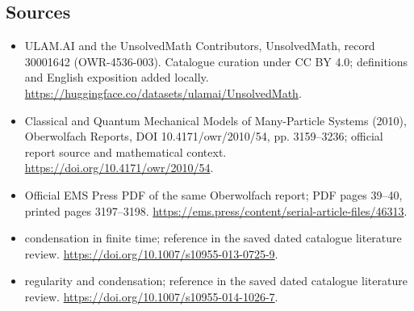 \documentclass[11pt]{article}
\begin{document}
\subsection{Sources}
\begin{itemize}
\item[\hypertarget{source:30001642:1}{S1}] ULAM.AI and the UnsolvedMath Contributors, UnsolvedMath, record 30001642 (OWR-4536-003). Catalogue curation under CC BY 4.0; definitions and English exposition added locally.
\url{https://huggingface.co/datasets/ulamai/UnsolvedMath}.
\item[\hypertarget{source:30001642:2}{S2}] Classical and Quantum Mechanical Models of Many-Particle Systems (2010), Oberwolfach Reports, DOI 10.4171/owr/2010/54, pp. 3159--3236; official report source and mathematical context.
\url{https://doi.org/10.4171/owr/2010/54}.
\item[\hypertarget{source:30001642:3}{S3}] Official EMS Press PDF of the same Oberwolfach report; PDF pages 39--40, printed pages 3197--3198.
\url{https://ems.press/content/serial-article-files/46313}.
\item[\hypertarget{source:30001642:4}{S4}] condensation in finite time; reference in the saved dated catalogue literature review.
\url{https://doi.org/10.1007/s10955-013-0725-9}.
\item[\hypertarget{source:30001642:5}{S5}] regularity and condensation; reference in the saved dated catalogue literature review.
\url{https://doi.org/10.1007/s10955-014-1026-7}.
\end{itemize}
\label{end:30001642}
\end{document}
